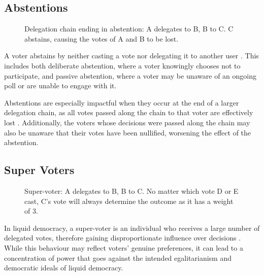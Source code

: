 \subsection*{Abstentions}
\begin{figure}[H]
  \centering
  \caption{Delegation chain ending in abstention: A delegates to B, B to C. C abstains, causing the votes of A and B to be lost.}
  \label{fig:delegation-abstention}
\end{figure}

A voter abstains by neither casting a vote nor delegating it to another user \citep{brill_liquid_2022}. This includes both deliberate abstention, where a voter knowingly chooses not to participate, and passive abstention, where a voter may be unaware of an ongoing poll or are unable to engage with it.

Abstentions are especially impactful when they occur at the end of a larger delegation chain, as all votes passed along the chain to that voter are effectively lost \citep{brill_liquid_2022}. Additionally, the voters whose decisions were passed along the chain may also be unaware that their votes have been nullified, worsening the effect of the abstention.

\subsection*{Super Voters}
\begin{figure}[h]
  \centering
  \caption{Super-voter: A delegates to B, B to C. No matter which vote D or E cast, C's vote will always determine the outcome as it has a weight of 3.}
  \label{fig:delegation-supervoter}
\end{figure}
In liquid democracy, a super-voter is an individual who receives a large number of delegated votes, therefore gaining disproportionate influence over decisions \citep{kling2015votingbehaviourpoweronline}. While this behaviour may reflect voters' genuine preferences, it can lead to a concentration of power that goes against the intended egalitarianism and democratic ideals of liquid democracy.

